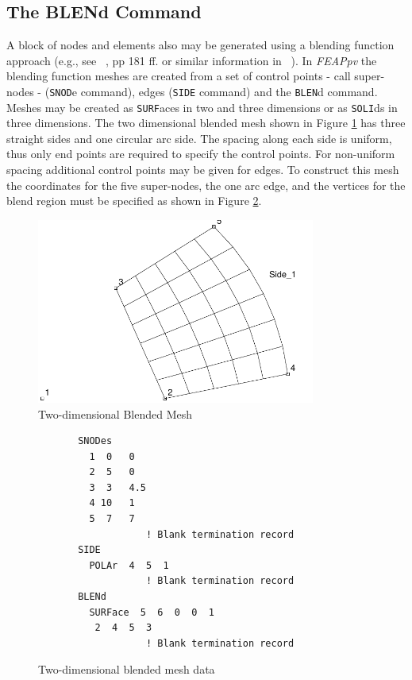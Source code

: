 \subsection{The BLENd Command}
\label{blend}

A block of nodes and elements also may be generated using a
blending function approach
(e.g., see ~\cite{zt1}, pp 181 ff. or similar information in ~\cite{zt1n}).
In {\sl FEAPpv} the blending function meshes are created from a set of control
points - call super-nodes - ({\tt SNOD}e command),
edges ({\tt SIDE} command) and
the {\tt BLEN}d command.  Meshes may be created as {\tt SURF}aces in
two and three dimensions or as {\tt SOLI}ds in three dimensions.  The
two dimensional blended mesh shown in Figure \ref{figb1} has three straight
sides and one circular arc side.  The spacing along each side is uniform,
thus only end points are required to specify the control points.
For non-uniform spacing additional control points may be given
for edges.  To construct this mesh the coordinates for the five
super-nodes, the one arc edge, and the vertices for the blend
region must be specified as shown in Figure \ref{figb2}.

\begin{figure}[ht!]
\centerline {\hfil \includegraphics[width=3.6in]{figs/figb1} \hfil}
\caption{Two-dimensional Blended Mesh}
\label{figb1}
\end{figure}

\begin{figure}[ht!]
\begin{verbatim}
       SNODes
         1  0   0
         2  5   0
         3  3   4.5
         4 10   1
         5  7   7
                   ! Blank termination record
       SIDE
         POLAr  4  5  1
                   ! Blank termination record
       BLENd
         SURFace  5  6  0  0  1
          2  4  5  3
                   ! Blank termination record
\end{verbatim}
\caption{Two-dimensional blended mesh data}
\label{figb2}
\end{figure}

